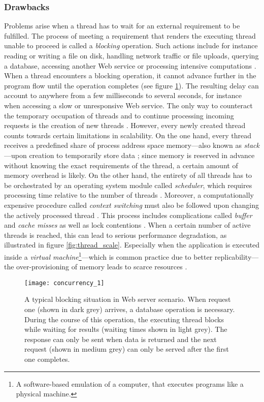 \subsubsection*{Drawbacks}
Problems arise when a thread has to wait for an external requirement to be fulfilled. The process of meeting a requirement that renders the executing thread unable to proceed is called a \textit{blocking} operation. Such actions include for instance reading or writing a file on disk, handling network traffic or file uploads, querying a database, accessing another Web service or processing intensive computations \cite[p. 196]{Henderson2006}. When a thread encounters a blocking operation, it cannot advance further in the program flow until the operation completes (see figure \ref{fig:concurrency_1}). The resulting delay can account to anywhere from a few milliseconds to several seconds, for instance when accessing a slow or unresponsive Web service. The only way to counteract the temporary occupation of threads and to continue processing incoming requests is the creation of new threads \cite[p. 36]{Hughes-Croucher2012}. However, every newly created thread counts towards certain limitations in scalability. On the one hand, every thread receives a predefined share of process address space memory---also known as \textit{stack}---upon creation to temporarily store data \cite{Russinovich}; since memory is reserved in advance without knowing the exact requirements of the thread, a certain amount of memory overhead is likely. On the other hand, the entirety of all threads has to be orchestrated by an operating system module called \textit{scheduler}, which requires processing time relative to the number of threads \cite{Russinovich}. Moreover, a computationally expensive procedure called \textit{context switching} must also be followed upon changing the actively processed thread \cite{threads_vs_events}. This process includes complications called \textit{buffer} and \textit{cache misses} as well as lock contentions \cite[p. 2]{Welsh2001}. When a certain number of active threads is reached, this can lead to serious performance degradation, as illustrated in figure \ref{fig:thread_scale}. Especially when the application is executed inside a \textit{virtual machine}\footnote{A software-based emulation of a computer, that executes programs like a physical machine.}---which is common practice due to better replicability---the over-provisioning of memory leads to scarce resources \cite[p. 1]{Haller2006}.

\begin{figure}
\centering\small
\setlength{\tabcolsep}{0mm}
  \texttt{[image: concurrency\_1]}
\caption{
A typical blocking situation in Web server scenario. When request one (shown in dark grey) arrives, a database operation is necessary. During the course of this operation, the executing thread blocks while waiting for results (waiting times shown in light grey). The response can only be sent when data is returned and the next request (shown in medium grey) can only be served after the first one completes.
}
\label{fig:concurrency_1}
\end{figure}

